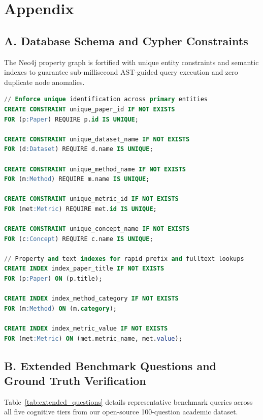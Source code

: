 \documentclass[12pt,a4paper,oneside]{report}
\begin{document}
\chapter*{Appendix}
\label{chap:appendix}

\section*{A. Database Schema and Cypher Constraints}
The Neo4j property graph is fortified with unique entity constraints and semantic indexes to guarantee sub-millisecond AST-guided query execution and zero duplicate node anomalies.

\begin{lstlisting}[language=SQL, caption={Neo4j Database Uniqueness Constraints and Property Indexes}]
// Enforce unique identification across primary entities
CREATE CONSTRAINT unique_paper_id IF NOT EXISTS
FOR (p:Paper) REQUIRE p.id IS UNIQUE;

CREATE CONSTRAINT unique_dataset_name IF NOT EXISTS
FOR (d:Dataset) REQUIRE d.name IS UNIQUE;

CREATE CONSTRAINT unique_method_name IF NOT EXISTS
FOR (m:Method) REQUIRE m.name IS UNIQUE;

CREATE CONSTRAINT unique_metric_id IF NOT EXISTS
FOR (met:Metric) REQUIRE met.id IS UNIQUE;

CREATE CONSTRAINT unique_concept_name IF NOT EXISTS
FOR (c:Concept) REQUIRE c.name IS UNIQUE;

// Property and text indexes for rapid prefix and fulltext lookups
CREATE INDEX index_paper_title IF NOT EXISTS
FOR (p:Paper) ON (p.title);

CREATE INDEX index_method_category IF NOT EXISTS
FOR (m:Method) ON (m.category);

CREATE INDEX index_metric_value IF NOT EXISTS
FOR (met:Metric) ON (met.metric_name, met.value);
\end{lstlisting}

\section*{B. Extended Benchmark Questions and Ground Truth Verification}
Table~\ref{tab:extended_questions} details representative benchmark queries across all five cognitive tiers from our open-source 100-question academic dataset.
\end{document}
